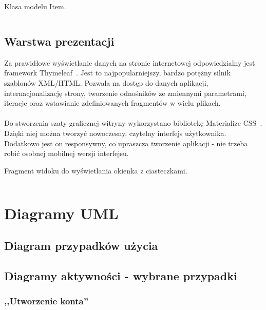 \documentclass[12pt,a4paper,titlepage]{article}
\begin{document}
\begin{listing}[H]
\caption{Klasa modelu Item.}
\inputminted{java}{Code/Item.java}
\end{listing}

\subsection{Warstwa prezentacji}
Za prawidłowe wyświetlanie danych na stronie internetowej odpowiedzialny jest framework Thymeleaf~\cite{thymeleaf}. Jest to najpopularniejszy, bardzo potężny silnik szablonów XML/HTML. Pozwala na dostęp do danych aplikacji, internacjonalizację strony, tworzenie odnośników ze zmiennymi parametrami, iteracje oraz wstawianie zdefiniowanych fragmentów w wielu plikach. \\\\
Do stworzenia szaty graficznej witryny wykorzystano bibliotekę Materialize CSS~\cite{materialize}. Dzięki niej można tworzyć nowoczesny, czytelny interfejs użytkownika. Dodatkowo jest on responsywny, co upraszcza tworzenie aplikacji - nie trzeba robić osobnej mobilnej wersji interfejsu.

\begin{listing}[H]
\caption{Fragment widoku do wyświetlania okienka z ciasteczkami.}
\inputminted{html}{Code/cookiesModal.html}
\end{listing}

\newpage
\section{Diagramy UML}
\subsection{Diagram przypadków użycia}
\begin{figure}[H]
    \centering
    \scalebox{.8}{}
\end{figure}

\subsection{Diagramy aktywności - wybrane przypadki}

\subsubsection{,,Utworzenie konta''}
\begin{figure}[H]
    \centering
    \scalebox{.8}{}
\end{figure}
\end{document}
